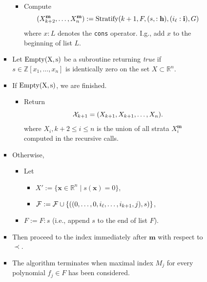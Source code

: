 \documentclass[
]{book}
\providecommand{\tightlist}{%
  \setlength{\itemsep}{0pt}\setlength{\parskip}{0pt}}
\theoremstyle{definition}
\theoremstyle{definition}
\theoremstyle{definition}
\theoremstyle{definition}
\theoremstyle{remark}
\begin{document}
\begin{itemize}
\begin{itemize}
\begin{itemize}
\begin{itemize}
        \begin{itemize}
        \tightlist
        \item
          Compute
          \[(X^{\mathbf{m}}_{k+2},\ldots,X^{\mathbf{m}}_n) := {\rm Stratify}(k+1, F, (s,:\mathbf{h}), (i_\ell:\mathbf{i}), G)\]
          where \(x:L\) denotes the \texttt{cons} operator. I.g., add \(x\) to the beginning of list \(L\).
        \end{itemize}
      \item
        Let \(\rm{Empty}(X,s)\) be a subroutine returning \emph{true} if \(s \in \mathbb{Z}[x_1,\ldots,x_n]\) is identically zero on the set \(X \subset \mathbb{R}^n\).
      \item
        If \(\rm{Empty}(X,s)\), we are finished.

        \begin{itemize}
        \tightlist
        \item
          Return
          \[{\cal X}_{k+1} = (X_{k+1}, X_{k+1}, \ldots, X_n).\]
          where \(X_i, k+2\le i \le n\) is the union of all strata \(X^{\mathbf{m}}_i\) computed in the recursive calls.
        \end{itemize}
      \item
        Otherwise,

        \begin{itemize}
        \item
          Let

          \begin{itemize}
          \item
            \(X' := \{ \mathbf{x} \in \mathbb{R}^n \mid s(\mathbf{x}) = 0 \}\),
          \item
            \({\cal F} := {\cal F} \cup \{ ((0,\ldots,0,i_\ell,\ldots,i_{k+1},j), s) \}\),
          \end{itemize}
        \item
          \(F := F:s\) (i.e., append \(s\) to the end of list \(F\)).
        \end{itemize}
      \item
        Then proceed to the index immediately after \(\mathbf{m}\) with respect to \(\prec\).
      \item
        The algorithm terminates when maximal index \(M_j\) for every polynomial \(f_j \in F\) has been considered.
      \end{itemize}
    \end{itemize}
  \end{itemize}
\end{itemize}
\end{document}

